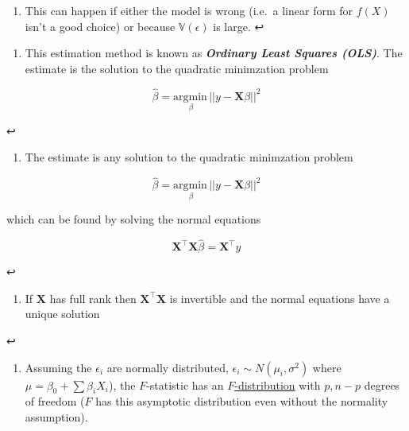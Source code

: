 \documentclass[11pt]{article}
\providecommand{\tightlist}{%
      \setlength{\itemsep}{0pt}\setlength{\parskip}{0pt}}
\begin{document}
\hypertarget{foot13}{}
\begin{enumerate}
\def\labelenumi{\arabic{enumi}.}
\setcounter{enumi}{12}
\tightlist
\item
  This can happen if either the model is wrong (i.e.~a linear form for
  \(f(X)\) isn't a good choice) or because \(\mathbb{V}(\epsilon)\) is
  large. ↩
\end{enumerate}

\hypertarget{foot14}{}
\begin{enumerate}
\def\labelenumi{\arabic{enumi}.}
\setcounter{enumi}{13}
\tightlist
\item
  This estimation method is known as \textbf{\emph{Ordinary Least
  Squares (OLS)}}. The estimate is the solution to the quadratic
  minimzation problem
\end{enumerate}

\[ \hat{\beta} = \underset{\beta}{\text{argmin}\,} || y - \mathbf{X}\beta ||^2 \]

↩

\hypertarget{foot15}{}
\begin{enumerate}
\def\labelenumi{\arabic{enumi}.}
\setcounter{enumi}{14}
\tightlist
\item
  The estimate is any solution to the quadratic minimzation problem
\end{enumerate}

\[ \hat{\beta} = \underset{\beta}{\text{argmin}\,} || y - \mathbf{X}\beta ||^2 \]

which can be found by solving the normal equations

\[\mathbf{X}^\top\mathbf{X}\hat{\beta} = \mathbf{X}^\top y\]

↩

\hypertarget{foot16}{}
\begin{enumerate}
\def\labelenumi{\arabic{enumi}.}
\setcounter{enumi}{15}
\tightlist
\item
  If \(\mathbf{X}\) has full rank then \(\mathbf{X}^\top\mathbf{X}\) is
  invertible and the normal equations have a unique solution
\end{enumerate}

↩

\hypertarget{foot17}{}
\begin{enumerate}
\def\labelenumi{\arabic{enumi}.}
\setcounter{enumi}{16}
\tightlist
\item
  Assuming the \(\epsilon_i\) are normally distributed,
  \(\epsilon_i \sim N(\mu_i, \sigma^2)\) where
  \(\mu = \beta_0 + \sum \beta_i X_i\)), the \(F\)-statistic has an
  \href{https://en.wikipedia.org/wiki/F-distribution}{\(F\)-distribution}
  with \(p, n-p\) degrees of freedom (\(F\) has this asymptotic
  distribution even without the normality assumption).
\end{enumerate}
\end{document}

